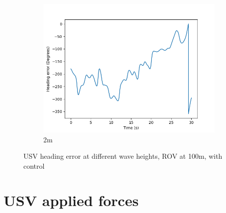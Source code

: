 \documentclass[class=article, crop=false]{standalone}
\begin{document}
\begin{figure}
\begin{subfigure}[b]{0.48\textwidth}
        \includegraphics{scenario1/rov-100m/2.0m/usv_heading_error_controlled}
        \caption{2m}
        \label{}
    \end{subfigure}

    \caption{USV heading error at different wave heights, ROV at 100m, with control}
\end{figure}
\FloatBarrier
\section{USV applied forces}
\end{document}
